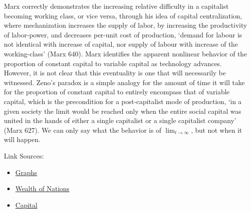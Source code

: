 \documentclass[12pt]{article}
\begin{document}
Marx correctly demonstrates the increasing relative difficulty in a capitalist becoming working class, or vice versa, through his idea of capital centralization, where mechanization increases the supply of labor, by increasing the productivity of labor-power, and decreases per-unit cost of production, `demand for labour is not identical with increase of capital, nor supply of labour with increase of the working-class' (Marx 640).
Marx identifies the apparent nonlinear behavior of the proportion of constant capital to variable capital as technology advances.
However, it is not clear that this eventuality is one that will necessarily be witnessed.
Zeno's paradox is a simple analogy for the amount of time it will take for the proportion of constant capital to entirely encompass that of variable capital, which is the precondition for a post-capitalist mode of production, `in a given society the limit would be reached only when the entire social capital was united in the hands of either a single capitalist or a single capitalist company' (Marx 627).
We can only say what the behavior is of $\lim_{t \to \infty}$, but not when it will happen.

Link Sources: 
\begin{itemize}
    \item \href{https://en.wikipedia.org/wiki/Graph_(abstract_data_type)}{Graphs}
	\item \href{https://archive.org/details/in.ernet.dli.2015.207956/page/n21/mode/2up}{Wealth of Nations}
	\item \href{http://www.archive.org/details/capitalcritiqueoOOmarx}{Capital}
\end{itemize}
\end{document}
